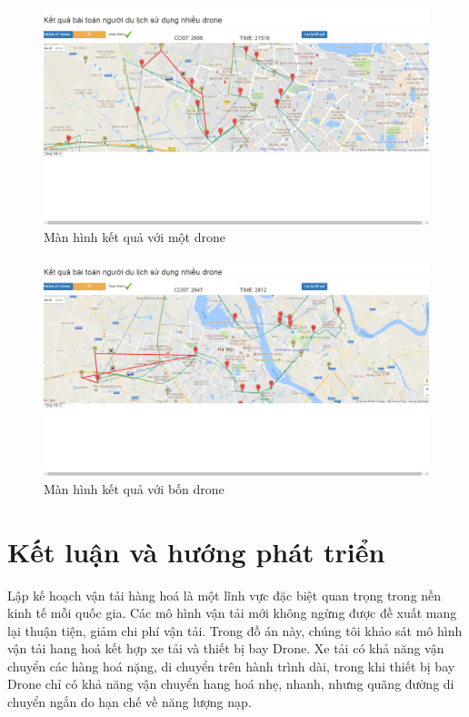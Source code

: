 \documentclass[a4paper,12pt]{report}
\begin{document}
\begin{figure}

\includegraphics[scale=0.41]{screen/solution1.png}
\caption{Màn hình kết quả với một drone}
\label{solution1}
\end{figure}
\begin{figure}

\includegraphics[scale=0.41]{screen/solution2.png}
\caption{Màn hình kết quả với bốn drone}
\label{solution2}
\end{figure}
\chapter*{Kết luận và hướng phát triển}
Lập kế hoạch vận tải hàng hoá là một lĩnh vực đặc biệt quan trọng trong nền kinh tế mỗi quốc gia. Các mô hình vận tải mới không ngừng được đề xuất mang lại thuận tiện, giảm chi phí vận tải. Trong đồ án này, chúng tôi khảo sát mô hình vận tải hang hoá kết hợp xe tải và thiết bị bay Drone. Xe tải có khả năng vận chuyển các hàng hoá nặng, di chuyển trên hành trình dài, trong khi thiết bị bay Drone chỉ có khả năng vận chuyển hang hoá nhẹ, nhanh, nhưng quãng đường di chuyển ngắn do hạn chế về năng lượng nạp. 
\end{document}
